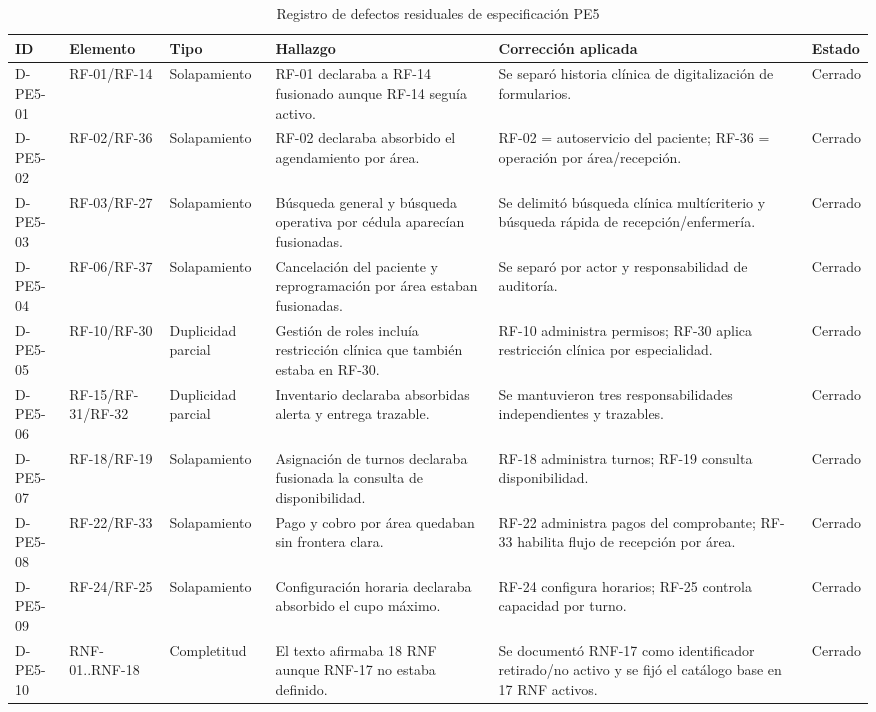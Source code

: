 \documentclass[11pt,a4paper]{article}
\begin{document}
	\begin{longtable}{p{1.5cm}p{2cm}p{2.3cm}p{3.5cm}p{4.5cm}p{1.3cm}}
		\caption{Registro de defectos residuales de especificación PE5}\label{tab:defectos}\\\toprule
		\textbf{ID}&\textbf{Elemento}&\textbf{Tipo}&\textbf{Hallazgo}&\textbf{Corrección aplicada}&\textbf{Estado}\\\midrule\endhead
		D-PE5-01 & RF-01/RF-14 & Solapamiento & RF-01 declaraba a RF-14 fusionado aunque RF-14 seguía activo. & Se separó historia clínica de digitalización de formularios. & Cerrado\\
		D-PE5-02 & RF-02/RF-36 & Solapamiento & RF-02 declaraba absorbido el agendamiento por área. & RF-02 = autoservicio del paciente; RF-36 = operación por área/recepción. & Cerrado\\
		D-PE5-03 & RF-03/RF-27 & Solapamiento & Búsqueda general y búsqueda operativa por cédula aparecían fusionadas. & Se delimitó búsqueda clínica multícriterio y búsqueda rápida de recepción/enfermería. & Cerrado\\
		D-PE5-04 & RF-06/RF-37 & Solapamiento & Cancelación del paciente y reprogramación por área estaban fusionadas. & Se separó por actor y responsabilidad de auditoría. & Cerrado\\
		D-PE5-05 & RF-10/RF-30 & Duplicidad parcial & Gestión de roles incluía restricción clínica que también estaba en RF-30. & RF-10 administra permisos; RF-30 aplica restricción clínica por especialidad. & Cerrado\\
		D-PE5-06 & RF-15/RF-31/RF-32 & Duplicidad parcial & Inventario declaraba absorbidas alerta y entrega trazable. & Se mantuvieron tres responsabilidades independientes y trazables. & Cerrado\\
		D-PE5-07 & RF-18/RF-19 & Solapamiento & Asignación de turnos declaraba fusionada la consulta de disponibilidad. & RF-18 administra turnos; RF-19 consulta disponibilidad. & Cerrado\\
		D-PE5-08 & RF-22/RF-33 & Solapamiento & Pago y cobro por área quedaban sin frontera clara. & RF-22 administra pagos del comprobante; RF-33 habilita flujo de recepción por área. & Cerrado\\
		D-PE5-09 & RF-24/RF-25 & Solapamiento & Configuración horaria declaraba absorbido el cupo máximo. & RF-24 configura horarios; RF-25 controla capacidad por turno. & Cerrado\\
		D-PE5-10 & RNF-01..RNF-18 & Completitud & El texto afirmaba 18 RNF aunque RNF-17 no estaba definido. & Se documentó RNF-17 como identificador retirado/no activo y se fijó el catálogo base en 17 RNF activos. & Cerrado\\
		\bottomrule\end{longtable}
	
\end{document}
